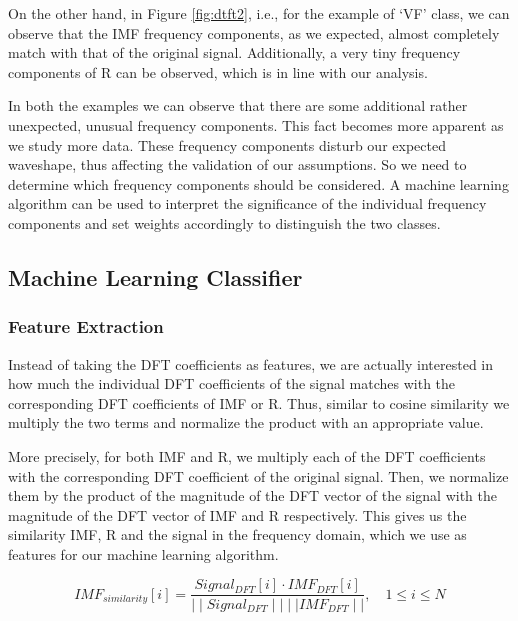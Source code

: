 \documentclass[12pt,a4paper]{article}
\begin{document}
 On the other hand, in Figure \ref{fig:dtft2}, i.e., for the example of `VF' class, we can observe that the IMF frequency components, as we expected, almost completely match with that of the original signal. Additionally, a very tiny frequency components of R can be observed, which is in line with our analysis.

 In both the examples we can observe that there are some additional rather unexpected, unusual frequency components. This fact becomes more apparent as we study more data. These frequency components disturb our expected waveshape, thus affecting the validation of our assumptions. So we need to determine which frequency components should be considered. A machine learning algorithm can be used to interpret the significance of the individual frequency components and set weights accordingly to distinguish the two classes. 




\subsection{Machine Learning Classifier}
\subsubsection{Feature Extraction}

Instead of taking the DFT coefficients as features, we are actually interested in how much the individual DFT coefficients of the signal matches with the corresponding DFT coefficients of IMF or R. Thus, similar to cosine similarity we multiply the two terms and normalize the product with an appropriate value.

More precisely, for both IMF and R, we multiply each of the DFT coefficients with the corresponding DFT coefficient of the original signal. Then, we normalize them by the product of the magnitude of the DFT vector of the signal with the magnitude of the DFT vector of IMF and R respectively. This gives us the similarity IMF, R and the signal in the frequency domain, which we use as features for our machine learning algorithm.

    \begin{equation}
        IMF_{similarity}[i]=\frac{Signal_{DFT}[i] \cdot IMF_{DFT}[i] }{{\mid\mid Signal_{DFT} \mid\mid \text{} \mid\mid IMF_{DFT}\mid\mid}}, \quad 1 \leq i \leq N
    \end{equation}
    
\end{document}
